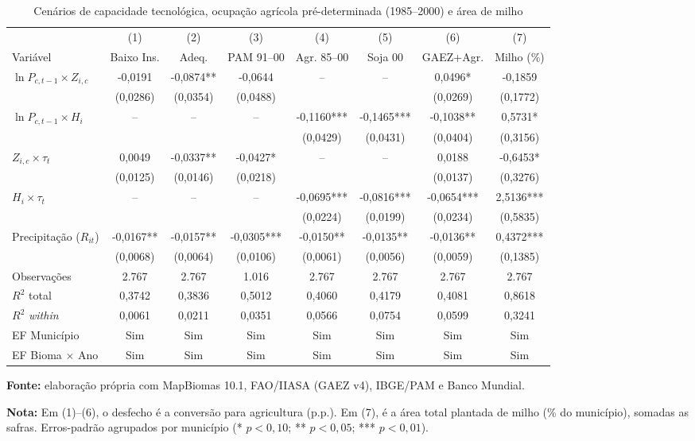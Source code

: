 \begin{table}[htbp]
\centering
\footnotesize
\setlength{\tabcolsep}{2.6pt}
\captionstyle{\centering}
\normalcaption
\caption{Cenários de capacidade tecnológica, ocupação agrícola pré-determinada (1985--2000) e área de milho}
\label{tab:h1-margens-tecnologia}
\begin{tabular}{lccccccc}
\toprule
 & (1) & (2) & (3) & (4) & (5) & (6) & (7) \\
Variável & Baixo Ins. & Adeq. & PAM 91--00 & Agr. 85--00 & Soja 00 & GAEZ+Agr. & Milho (\%) \\
\midrule
$\ln P_{c,t-1} \times Z_{i,c}$ & -0,0191 & -0,0874** & -0,0644 & -- & -- & 0,0496* & -0,1859 \\
 & (0,0286) & (0,0354) & (0,0488) &  &  & (0,0269) & (0,1772) \\
$\ln P_{c,t-1} \times H_i$ & -- & -- & -- & -0,1160*** & -0,1465*** & -0,1038** & 0,5731* \\
 &  &  &  & (0,0429) & (0,0431) & (0,0404) & (0,3156) \\
$Z_{i,c} \times \tau_t$ & 0,0049 & -0,0337** & -0,0427* & -- & -- & 0,0188 & -0,6453* \\
 & (0,0125) & (0,0146) & (0,0218) &  &  & (0,0137) & (0,3276) \\
$H_i \times \tau_t$ & -- & -- & -- & -0,0695*** & -0,0816*** & -0,0654*** & 2,5136*** \\
 &  &  &  & (0,0224) & (0,0199) & (0,0234) & (0,5835) \\
Precipitação ($R_{it}$) & -0,0167** & -0,0157** & -0,0305*** & -0,0150** & -0,0135** & -0,0136** & 0,4372*** \\
 & (0,0068) & (0,0064) & (0,0106) & (0,0061) & (0,0056) & (0,0059) & (0,1385) \\
\midrule
Observações & 2.767 & 2.767 & 1.016 & 2.767 & 2.767 & 2.767 & 2.767 \\
$R^2$ total & 0,3742 & 0,3836 & 0,5012 & 0,4060 & 0,4179 & 0,4081 & 0,8618 \\
$R^2$ \textit{within} & 0,0061 & 0,0211 & 0,0351 & 0,0566 & 0,0754 & 0,0599 & 0,3241 \\
EF Município & Sim & Sim & Sim & Sim & Sim & Sim & Sim \\
EF Bioma $\times$ Ano & Sim & Sim & Sim & Sim & Sim & Sim & Sim \\
\bottomrule
\end{tabular}
\par\smallskip\begin{minipage}{\textwidth}\footnotesize
\SingleSpacing
\noindent\textbf{Fonte:} elaboração própria com MapBiomas 10.1, FAO/IIASA (GAEZ v4), IBGE/PAM e Banco Mundial.\par\medskip
\noindent\textbf{Nota:} Em (1)--(6), o desfecho é a conversão para agricultura (p.p.). Em (7), é a área total plantada de milho (\% do município), somadas as safras. Erros-padrão agrupados por município (* $p<0{,}10$; ** $p<0{,}05$; *** $p<0{,}01$).
\end{minipage}
\end{table}
